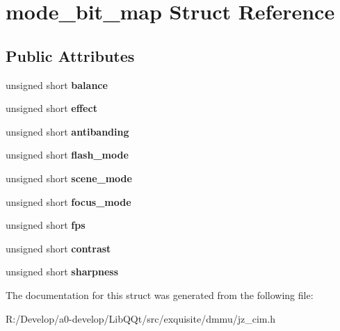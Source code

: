 \hypertarget{structmode__bit__map}{}\section{mode\+\_\+bit\+\_\+map Struct Reference}
\label{structmode__bit__map}
\subsection*{Public Attributes}
\begin{DoxyCompactItemize}
\item 
\mbox{\label{structmode__bit__map_a10c4af2348f4ac107596b0a8b9a3f9f6}} 
unsigned short {\bfseries balance}
\item 
\mbox{\label{structmode__bit__map_ab59af737bd3bebd8ba5baddfd04705e9}} 
unsigned short {\bfseries effect}
\item 
\mbox{\label{structmode__bit__map_a2fee94692b1e9946a1454a44690d517a}} 
unsigned short {\bfseries antibanding}
\item 
\mbox{\label{structmode__bit__map_a1a470b4f125c703b9a346cbf3ded39d8}} 
unsigned short {\bfseries flash\+\_\+mode}
\item 
\mbox{\label{structmode__bit__map_a0d195522a8b9e1ffb2818d89ade80e40}} 
unsigned short {\bfseries scene\+\_\+mode}
\item 
\mbox{\label{structmode__bit__map_afbc01c523aee8a03e4bde1f4043aef45}} 
unsigned short {\bfseries focus\+\_\+mode}
\item 
\mbox{\label{structmode__bit__map_a3b002d42c4e553c32785839df31c618d}} 
unsigned short {\bfseries fps}
\item 
\mbox{\label{structmode__bit__map_aa756da6f718201975843c9f8ca3c60ad}} 
unsigned short {\bfseries contrast}
\item 
\mbox{\label{structmode__bit__map_a3bb9104e80fc51e2465ec99344a5de99}} 
unsigned short {\bfseries sharpness}
\end{DoxyCompactItemize}


The documentation for this struct was generated from the following file\+:\begin{DoxyCompactItemize}
\item 
R\+:/\+Develop/a0-\/develop/\+Lib\+Q\+Qt/src/exquisite/dmmu/jz\+\_\+cim.\+h\end{DoxyCompactItemize}
